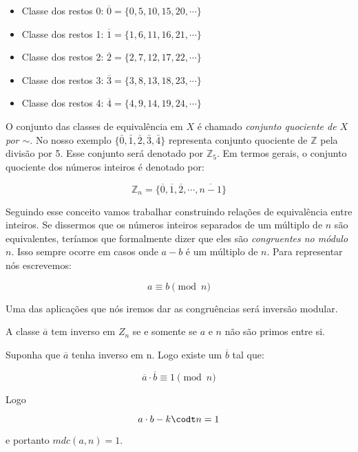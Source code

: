 	\begin{itemize}
		\item Classe dos restos 0: $\overline{0}=\{0, 5, 10, 15, 20, \cdots\}$
		\item Classe dos restos 1: $\overline{1}=\{1, 6, 11, 16, 21, \cdots\}$
		\item Classe dos restos 2: $\overline{2}=\{2, 7, 12, 17, 22, \cdots\}$
		\item Classe dos restos 3: $\overline{3}=\{3, 8, 13, 18, 23, \cdots\}$
		\item Classe dos restos 4: $\overline{4}=\{4, 9, 14, 19, 24, \cdots\}$
	\end{itemize}

O conjunto das classes de equival\^encia em $X$ \'e chamado \textit{conjunto quociente de $X$ por $\sim$}. No nosso exemplo $\{\bar{0}, \bar{1}, \bar{2}, \bar{3}, \bar{4}\}$ representa conjunto quociente de $\mathbb{Z}$ pela divis\~ao por 5. Esse conjunto ser\'a denotado por $\mathbb{Z}_{5}$. Em termos gerais, o conjunto quociente dos n\'umeros inteiros \'e denotado por:

$$\mathbb{Z}_{n}=\{\overline{0}, \overline{1}, \overline{2}, \cdots, \overline{n-1}\}$$ 

Seguindo esse conceito vamos trabalhar construindo rela\c{c}\~oes de equival\^encia entre inteiros. Se dissermos que os n\'umeros inteiros separados de um m\'ultiplo de $n$ s\~ao equivalentes, ter\'iamos que formalmente dizer que eles s\~ao \textit{congruentes no m\'odulo $n$}. Isso sempre ocorre em casos onde $a-b$ \'e um m\'ultiplo de $n$. Para representar n\'os escrevemos:

$$a \equiv b \pmod{n}$$ 

Uma das aplica\c{c}\~oes que n\'os iremos dar as congru\^encias ser\'a invers\~ao modular. 

\begin{Th}\label{inversao}
A classe $\overline{a}$ tem inverso em $Z_n$ se e somente se $a$ e $n$ n\~ao s\~ao primos entre si.
\end{Th}

\newline
Suponha que $\overline{a}$ tenha inverso em n. Logo existe um $\overline{b}$ tal que:

$$\overline{a} \cdot \overline{b} \equiv 1 \pmod{n}$$

Logo

$$a \cdot b - k \codt n = 1 $$

e portanto $mdc(a,n) = 1$.

